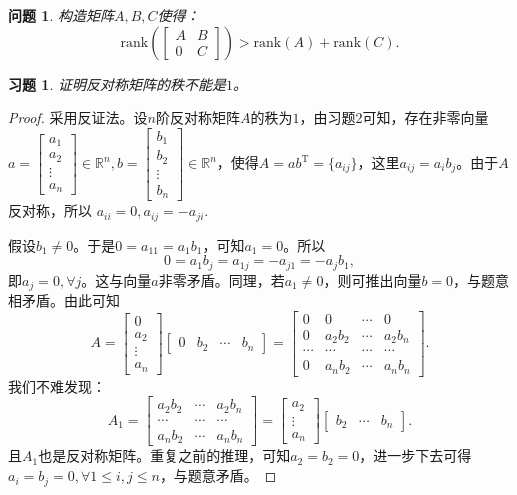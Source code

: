 \documentclass[UTF8]{ctexart}
\newtheorem{ques}[thm]{问题}
\newtheorem{ex}[thm]{习题}
\begin{document}
\begin{ques}
	构造矩阵$A, B, C$使得：
	\[
	\mathrm{rank}(\begin{bmatrix}
		A & B \\
		0 & C
	\end{bmatrix}) > \mathrm{rank}(A) + \mathrm{rank}(C).
	\]
\end{ques}


\begin{ex}
	证明反对称矩阵的秩不能是$1$。
\end{ex}
\begin{proof}采用反证法。设$n$阶反对称矩阵$A$的秩为$1$，由习题2可知，存在非零向量$a = \begin{bmatrix}
		a_1 \\
		a_2 \\
		\vdots \\
		a_n
	\end{bmatrix} \in \mathbb{R}^n, b = \begin{bmatrix}
		b_1 \\
		b_2 \\
		\vdots \\
		b_n
	\end{bmatrix} \in \mathbb{R}^n$，使得$A = ab^{\mathrm{T}} = \{ a_{ij}\}$，这里$a_{ij} = a_i b_j$。由于$A$反对称，所以
	$
	a_{ii}=0, a_{ij} = -a_{ji}.
	$
	\
	
	假设$b_1 \neq 0$。于是$0 = a_{11} = a_1 b_1$，可知$a_1 = 0$。所以
	\[
	0 = a_1 b_j = a_{1j} = - a_{j1} = - a_j b_1,
	\]
	即$a_j = 0, \forall j$。这与向量$a$非零矛盾。同理，若$a_1 \neq 0$，则可推出向量$b=0$，与题意相矛盾。由此可知
	\[
	A = \begin{bmatrix}
		0 \\
		a_2 \\
		\vdots \\
		a_n
	\end{bmatrix} \begin{bmatrix}
		0 & b_2 & \cdots & b_n
	\end{bmatrix} = 
	\begin{bmatrix}
		0 & 0 & \cdots & 0\\
		0 & a_2b_2 & \cdots & a_2b_n\\
		\cdots & \cdots & \cdots & \cdots \\
		0 & a_nb_2 & \cdots & a_nb_n
	\end{bmatrix}.
	\]
	我们不难发现：
	\[
	A_1 = \begin{bmatrix}
		a_2b_2 & \cdots & a_2b_n\\
		\cdots & \cdots & \cdots \\
		a_nb_2 & \cdots & a_nb_n
	\end{bmatrix} = \begin{bmatrix}
		a_2 \\
		\vdots \\
		a_n
	\end{bmatrix} \begin{bmatrix}
		b_2 & \cdots & b_n
	\end{bmatrix}.
	\]
	且$A_1$也是反对称矩阵。重复之前的推理，可知$a_2 = b_2 =0$，进一步下去可得$a_i = b_j = 0, \forall 1 \leq i,j \leq n$，与题意矛盾。
\end{proof}
\end{document}
